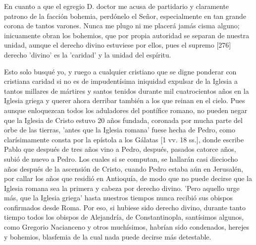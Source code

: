 En cuanto a que el egregio D. doctor me acusa de partidario y claramente patrono de la facción bohemia, perdónelo el Señor, especialmente en tan grande corona de tantos varones. Nunca me plugo ni me placerá jamás cisma alguno; inicuamente obran los bohemios, que por propia autoridad se separan de nuestra unidad, aunque el derecho divino estuviese por ellos, pues el supremo [276] derecho 'divino' es la 'caridad' y la unidad del espíritu.

Esto solo busqué yo, y ruego a cualquier cristiano que se digne ponderar con cristiana caridad si no es de impudentísima iniquidad expulsar de la Iglesia a tantos millares de mártires y santos tenidos durante mil cuatrocientos años en la Iglesia griega y querer ahora derribar también a los que reinan en el cielo. Pues aunque enloquezcan todos los aduladores del pontífice romano, no pueden negar que la Iglesia de Cristo estuvo 20 años fundada, coronada por mucha parte del orbe de las tierras, 'antes que la Iglesia romana' fuese hecha de Pedro, como clarísimamente consta por la epístola a los Gálatas [1 vv. 18 ss.], donde escribe Pablo que después de tres años vino a Pedro, después, pasados catorce años, subió de nuevo a Pedro. Los cuales si se computan, se hallarán casi dieciocho años después de la ascensión de Cristo, cuando Pedro estaba aún en Jerusalén, por callar los años que residió en Antioquía, de modo que no puede decirse que la Iglesia romana sea la primera y cabeza por derecho divino. 'Pero aquello urge más, que la Iglesia griega' hasta nuestros tiempos nunca recibió sus obispos confirmados desde Roma. Por eso, si hubiese sido derecho divino, durante tanto tiempo todos los obispos de Alejandría, de Constantinopla, santísimos algunos, como Gregorio Nacianceno y otros muchísimos, habrían sido condenados, herejes y bohemios, blasfemia de la cual nada puede decirse más detestable.

